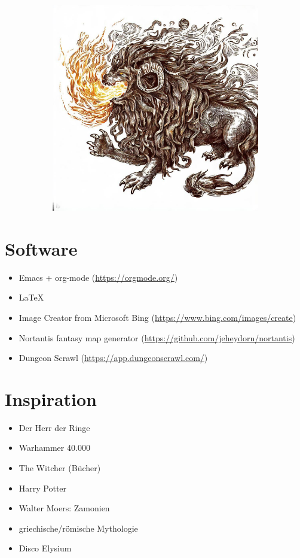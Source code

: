 \documentclass[11pt, twoside]{article}
\begin{document}
\begin{figure}[H]
\begin{subfigure}{0.3\textwidth}
  \end{subfigure}%
  \begin{subfigure}{0.3\textwidth}
    \centering
    \includegraphics[width=0.99\linewidth]{chim3.jpeg}
  \end{subfigure}
\end{figure}

\newpage
\appendix
\listoffigures
\newpage

\section{Software}
\label{sec:org6a2363c}
\begin{itemize}
\item Emacs + org-mode (\href{https://orgmode.org/}{https://orgmode.org/})
\item \LaTeX
\item Image Creator from Microsoft Bing (\href{https://www.bing.com/images/create}{https://www.bing.com/images/create})
\item Nortantis fantasy map generator (\href{https://github.com/jeheydorn/nortantis}{https://github.com/jeheydorn/nortantis})
\item Dungeon Scrawl (\href{https://app.dungeonscrawl.com/}{https://app.dungeonscrawl.com/})
\end{itemize}

\section{Inspiration}
\label{sec:org6e5d8f8}
\begin{itemize}
\item Der Herr der Ringe
\item Warhammer 40.000
\item The Witcher (Bücher)
\item Harry Potter
\item Walter Moers: Zamonien
\item griechische/römische Mythologie
\item Disco Elysium
\end{itemize}
\end{document}

